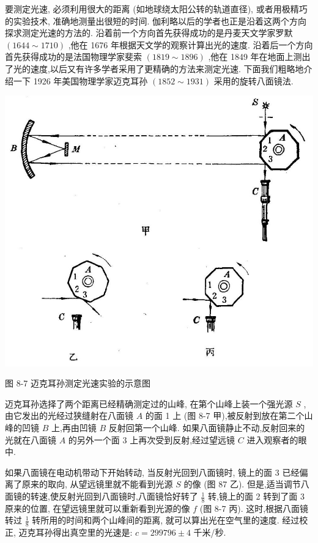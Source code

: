 \documentclass[10pt]{article}
\begin{document}
要测定光速, 必须利用很大的距离 (如地球绕太阳公转的轨道直径), 或者用极精巧的实验技术, 准确地测量出很短的时间. 伽利略以后的学者也正是沿着这两个方向探求测定光速的方法的. 沿着前一个方向首先获得成功的是丹麦天文学家罗默 \(\left( {{1644} \sim {1710}}\right)\) ,他在 1676 年根据天文学的观察计算出光的速度. 沿着后一个方向首先获得成功的是法国物理学家斐索 \(\left( {{1819} \sim {1896}}\right)\) ,他在 1849 年在地面上测出了光的速度,以后又有许多学者采用了更精确的方法来测定光速. 下面我们粗略地介绍一下 1926 年美国物理学家迈克耳孙 \(\left( {{1852} \sim {1931}}\right)\) 采用的旋转八面镜法.

\begin{center}
\includegraphics[max width=1.0\textwidth]{images/01913056-1f15-74d8-9184-9aab52c9d66b_248_249440.jpg}
\end{center}

图 8-7 迈克耳孙测定光速实验的示意图

迈克耳孙选择了两个距离已经精确测定过的山峰, 在第个山峰上装一个强光源 \(S\) ,由它发出的光经过狭缝射在八面镜 \(A\) 的面 1 上 (图 8-7 甲),被反射到放在第二个山峰的凹镜 \(B\) 上,再由凹镜 \(B\) 反射回第一个山峰. 如果八面镜静止不动,反射回来的光就在八面镜 \(A\) 的另外一个面 3 上再次受到反射,经过望远镜 \(C\) 进入观察者的眼中.

如果八面镜在电动机带动下开始转动, 当反射光回到八面镜时, 镜上的面 3 已经偏离了原来的取向, 从望远镜里就不能看到光源 \(S\) 的像 (图 87 乙). 但是,适当调节八面镜的转速,使反射光回到八面镜时,八面镜恰好转了 \(\frac{1}{8}\) 转,镜上的面 2 转到了面 3 原来的位置, 在望远镜里就可以重新看到光源的像 \(f\) (图 8-7 丙). 这时,根据八面镜转过 \(\frac{1}{8}\) 转所用的时间和两个山峰间的距离, 就可以算出光在空气里的速度. 经过校正, 迈克耳孙得出真空里的光速是: \(c = {299796} \pm 4\) 千米/秒.
\end{document}
